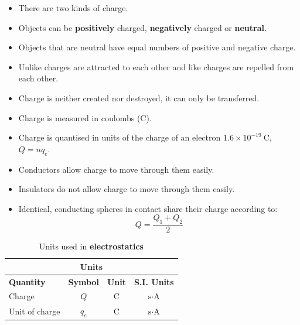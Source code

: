       \label{m38781*id201947}\begin{itemize}[noitemsep ] 
\item There are two kinds of charge.
            \label{m38781*uid14}\item Objects can be \textbf{positively} charged, \textbf{negatively} charged or \textbf{neutral}.
\label{m38781*uid15}\item Objects that are neutral have equal numbers of positive and negative charge.

\label{m38781*uid16}\item Unlike charges are attracted to each other and like charges are repelled from each other.
\label{m38781*uid17}\item Charge is neither created nor destroyed, it can only be transferred.
\label{m38781*uid18}\item Charge is measured in coulombs (C).
\item Charge is quantised in units of the charge of an electron $1.6\times10^{-19}~\text{C}$, $Q=nq_{e}$. 
\label{m38781*uid19}\item Conductors allow charge to move through them easily.
\label{m38781*uid20}\item Insulators do not allow charge to move through them easily.
\item Identical, conducting spheres in contact share their charge according to:
\begin{equation*}
 Q=\frac{Q_1+Q_2}{2}
\end{equation*}
\end{itemize}
\begin{table}[H]
\begin{center}
\begin{tabular}{|l|c|c|c|}\hline \hline 
\multicolumn{4}{|c|}{\textbf{Units}}\\ \hline \hline
\textbf{Quantity} & \textbf{Symbol} & \textbf{Unit} & \textbf{S.I. Units}\\ \hline
Charge & $Q$ & C & $\text{s}\cdot\text{A}$ \\ \hline
Unit of charge & $q_e$ & C & $\text{s}\cdot\text{A}$ \\ \hline
\end{tabular}
\end{center}
\caption{Units used in \textbf{electrostatics} }
\label{table:electrostatics::units}
\end{table}
% 
% 
